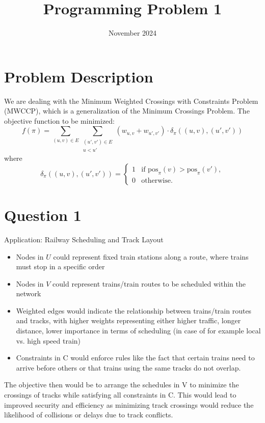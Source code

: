 \documentclass{article}
\title{Programming Problem 1}
\author{}
\date{November 2024}
\begin{document}
\maketitle

\section*{Problem Description}
We are dealing with the Minimum Weighted Crossings with Constraints Problem (MWCCP), which is a generalization of the Minimum Crossings Problem.
The objective function to be minimized:
\[
f(\pi) = \sum_{(u, v) \in E} \sum_{\substack{(u', v') \in E \\ u < u'}} 
(w_{u,v} + w_{u', v'}) \cdot \delta_{\pi}((u, v), (u', v'))
\]
where
\[
\delta_{\pi}((u, v), (u', v')) = 
\begin{cases} 
1 & \text{if } \text{pos}_{\pi}(v) > \text{pos}_{\pi}(v'), \\ 
0 & \text{otherwise.} 
\end{cases}
\]

\section*{Question 1}
Application: Railway Scheduling and Track Layout
\begin{itemize}
    \item Nodes in \(U\) could represent fixed train stations along a route, where trains must stop in a specific order
    \item Nodes in \(V\) could represent trains/train routes to be scheduled within the network
    \item Weighted edges would indicate the relationship between trains/train routes and tracks, with higher weights representing either higher traffic, longer distance, lower importance in terms of scheduling (in case of for example local vs. high speed train)
    \item Constraints in C would enforce rules like the fact that certain trains need to arrive before others or that trains using the same tracks do not overlap.
\end{itemize}

The objective then would be to arrange the schedules in V to minimize the crossings of tracks while satisfying all constraints in C. This would lead to improved security and efficiency as minimizing track crossings would reduce the likelihood of collisions or delays due to track conflicts.
\end{document}
